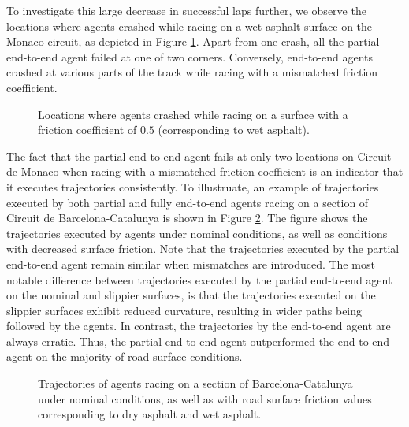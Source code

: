 To investigate this large decrease in successful laps further, we observe  the locations where agents crashed while racing on a wet asphalt surface on the Monaco circuit, as depicted in Figure \ref{fig:mu_crash_locations}.
Apart from one crash, all the partial end-to-end agent failed at one of two corners.
Conversely, end-to-end agents crashed at various parts of the track while racing with a mismatched friction coefficient.


\begin{figure}[htb!]
    \centering
    
    \caption[Locations where agents crashed while racing on a wet asphalt surface]{Locations where agents crashed while racing on a surface with a friction coefficient of $0.5$ (corresponding to wet asphalt).}
    \label{fig:mu_crash_locations}
\end{figure}

The fact that the partial end-to-end agent fails at only two locations on Circuit de Monaco when racing with a mismatched friction coefficient is an indicator that
it executes trajectories consistently.
To illustruate, an example of trajectories executed by both partial and fully end-to-end agents racing on a section of Circuit de Barcelona-Catalunya is shown in Figure \ref{fig:mu_lap}.
The figure shows the trajectories executed by agents under nominal conditions, as well as conditions with decreased surface friction.
Note that the trajectories executed by the partial end-to-end agent remain similar when mismatches are introduced.
The most notable difference between trajectories executed by the partial end-to-end agent on the nominal and slippier surfaces, is that the trajectories executed on the slippier surfaces exhibit reduced curvature, resulting in wider paths being followed by the agents.
In contrast, the trajectories by the end-to-end agent are always erratic.
Thus, the partial end-to-end agent outperformed the end-to-end agent on the majority of road surface conditions.

\begin{figure}[htb!]
    \centering
    
    \caption[Trajectories of agents racing with a decreased road surface friction coefficient]{Trajectories of agents racing on a section of Barcelona-Catalunya under nominal conditions, as well as with road surface friction values corresponding to dry asphalt and wet asphalt.}
    \label{fig:mu_lap}
\end{figure}

